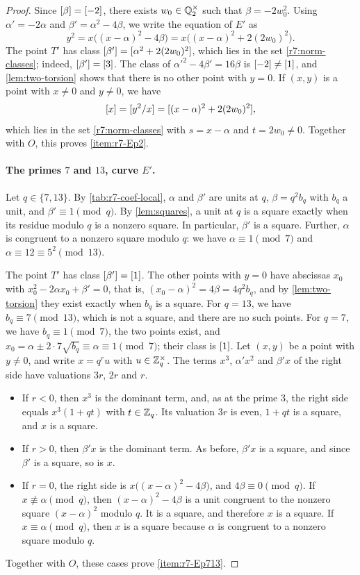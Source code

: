 \begin{proof}
Since $[\beta]=[-2]$, there exists $w_0\in\mathbb Q_2^\times$ such that
$\beta=-2w_0^2$. Using $\alpha'=-2\alpha$ and $\beta'=\alpha^2-4\beta$, we
write the equation of $E'$ as
\begin{equation}\label{r7:norm-form}
 y^2=x\bigl((x-\alpha)^2-4\beta\bigr)=x\bigl((x-\alpha)^2+2(2w_0)^2\bigr).
\end{equation}
The point $T'$ has class $[\beta']=[\alpha^2+2(2w_0)^2]$, which lies
in the set \eqref{r7:norm-classes}; indeed, $[\beta']=[3]$. The class
of $\alpha'^2-4\beta'=16\beta$ is $[-2]\ne[1]$, and
\cref{lem:two-torsion} shows that there is no other point with $y=0$. If
$(x,y)$ is a point with $x\ne0$ and $y\ne0$, we have
\[
 [x]=[y^2/x]=[(x-\alpha)^2+2(2w_0)^2],
\]
which lies in the set \eqref{r7:norm-classes} with $s=x-\alpha$ and
$t=2w_0\ne0$. Together with $O$, this proves \ref{item:r7-Ep2}.

\paragraph{The primes $7$ and $13$, curve $E'$.}
Let $q\in\{7,13\}$. By \cref{tab:r7-coef-local}, $\alpha$ and $\beta'$ are
units at $q$, $\beta=q^2b_q$ with $b_q$ a unit, and $\beta'\equiv1\pmod q$.
By \cref{lem:squares}, a unit at $q$ is a square exactly when its residue
modulo $q$ is a nonzero square. In particular, $\beta'$ is a square. Further,
$\alpha$ is congruent to a nonzero square modulo $q$: we have
$\alpha\equiv1\pmod7$ and $\alpha\equiv12\equiv5^2\pmod{13}$.

The point $T'$ has class $[\beta']=[1]$. The other points with $y=0$
have abscissas $x_0$ with $x_0^2-2\alpha x_0+\beta'=0$, that is,
$(x_0-\alpha)^2=4\beta=4q^2b_q$, and by \cref{lem:two-torsion} they exist
exactly when $b_q$ is a square. For $q=13$, we have $b_q\equiv7\pmod{13}$,
which is not a square, and there are no such points. For $q=7$, we have
$b_q\equiv1\pmod7$, the two points exist, and
$x_0=\alpha\pm2\cdot7\sqrt{b_q}\equiv\alpha\equiv1\pmod7$; their class is
$[1]$. Let $(x,y)$ be a point with $y\ne0$, and write $x=q^ru$ with
$u\in\mathbb Z_q^\times$. The terms $x^3$, $\alpha'x^2$ and $\beta'x$ of the right
side have valuations $3r$, $2r$ and $r$.
\begin{itemize}
\item If $r<0$, then $x^3$ is the dominant term, and, as at the prime $3$,
the right side equals $x^3(1+qt)$ with $t\in\mathbb Z_q$. Its valuation $3r$ is
even, $1+qt$ is a square, and $x$ is a square.
\item If $r>0$, then $\beta'x$ is the dominant term. As before,
$\beta'x$ is a square, and since $\beta'$ is a square, so is $x$.
\item If $r=0$, the right side is $x\bigl((x-\alpha)^2-4\beta\bigr)$, and
$4\beta\equiv0\pmod q$. If $x\not\equiv\alpha\pmod q$, then
$(x-\alpha)^2-4\beta$ is a unit congruent to the nonzero square
$(x-\alpha)^2$ modulo $q$. It is a square, and therefore $x$ is a square.
If $x\equiv\alpha\pmod q$, then $x$ is a square because $\alpha$ is
congruent to a nonzero square modulo $q$.
\end{itemize}
Together with $O$, these cases prove \ref{item:r7-Ep713}.


\end{proof}
